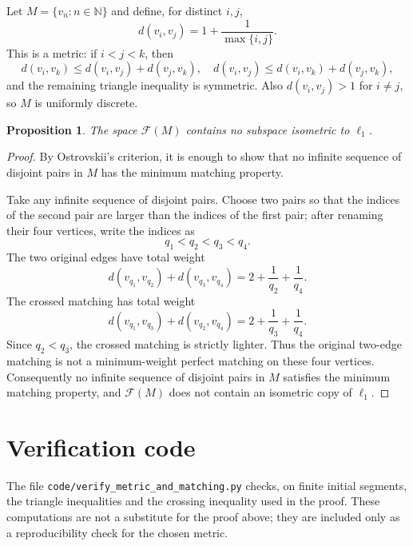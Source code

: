 \documentclass[11pt]{article}
\newtheorem*{proposition}{Proposition}
\begin{document}
Let $M=\{v_n:n\in\mathbb N\}$ and define, for distinct $i,j$,
\[
  d(v_i,v_j)=1+\frac{1}{\max\{i,j\}}.
\]
This is a metric: if $i<j<k$, then
\[
d(v_i,v_k)\le d(v_i,v_j)+d(v_j,v_k),\quad
d(v_i,v_j)\le d(v_i,v_k)+d(v_j,v_k),
\]
and the remaining triangle inequality is symmetric. Also $d(v_i,v_j)>1$ for
$i\ne j$, so $M$ is uniformly discrete.

\begin{proposition}
The space $\mathcal F(M)$ contains no subspace isometric to $\ell_1$.
\end{proposition}

\begin{proof}
By Ostrovskii's criterion, it is enough to show that no infinite sequence of
disjoint pairs in $M$ has the minimum matching property.

Take any infinite sequence of disjoint pairs. Choose two pairs so that the
indices of the second pair are larger than the indices of the first pair; after
renaming their four vertices, write the indices as
\[
  q_1<q_2<q_3<q_4 .
\]
The two original edges have total weight
\[
  d(v_{q_1},v_{q_2})+d(v_{q_3},v_{q_4})
  =2+\frac1{q_2}+\frac1{q_4}.
\]
The crossed matching has total weight
\[
  d(v_{q_1},v_{q_3})+d(v_{q_2},v_{q_4})
  =2+\frac1{q_3}+\frac1{q_4}.
\]
Since $q_2<q_3$, the crossed matching is strictly lighter. Thus the original
two-edge matching is not a minimum-weight perfect matching on these four
vertices. Consequently no infinite sequence of disjoint pairs in $M$ satisfies
the minimum matching property, and $\mathcal F(M)$ does not contain an
isometric copy of $\ell_1$.
\end{proof}

\section*{Verification code}

The file \texttt{code/verify\_metric\_and\_matching.py} checks, on finite
initial segments, the triangle inequalities and the crossing inequality used in
the proof. These computations are not a substitute for the proof above; they
are included only as a reproducibility check for the chosen metric.
\end{document}

